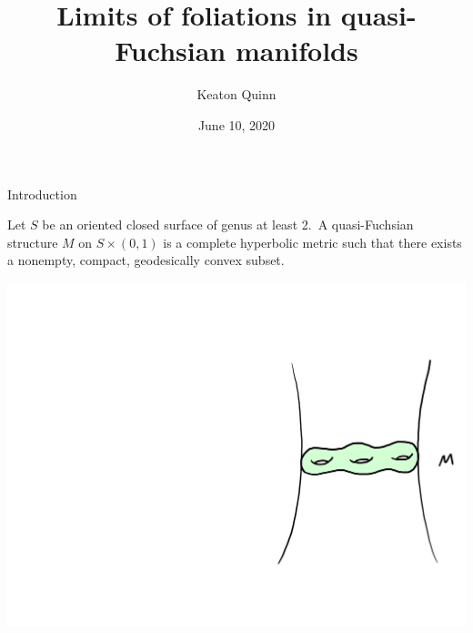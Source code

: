 \documentclass[professionalfont]{beamer}
\title{Limits of foliations in quasi-Fuchsian manifolds}
\author{Keaton Quinn}
\institute{University of Illinois at Chicago}
\date{June 10, 2020}
\begin{document}
\makeatletter
{}
{
}
\makeatother



\begin{frame}
\titlepage
\end{frame}




\begin{frame}{Introduction}

Let $S$ be an oriented closed surface of genus at least 2.\pause  \ A quasi-Fuchsian structure $M$ on $S \times (0,1)$ is a complete hyperbolic metric such that there exists a nonempty, compact, geodesically convex subset. \pause


\centering\includegraphics[scale=0.09]{QF-1.jpg}
	


\end{frame}


\end{document}
